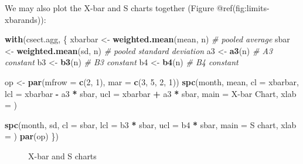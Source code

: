 \documentclass[
]{book}
\makeatletter
\newenvironment{Shaded}{\begin{snugshade}}{\end{snugshade}}
\newcommand{\AttributeTok}[1]{\textcolor[rgb]{0.13,0.29,0.53}{#1}}
\newcommand{\CommentTok}[1]{\textcolor[rgb]{0.56,0.35,0.01}{\textit{#1}}}
\newcommand{\DecValTok}[1]{\textcolor[rgb]{0.00,0.00,0.81}{#1}}
\newcommand{\FunctionTok}[1]{\textcolor[rgb]{0.13,0.29,0.53}{\textbf{#1}}}
\newcommand{\NormalTok}[1]{#1}
\newcommand{\OtherTok}[1]{\textcolor[rgb]{0.56,0.35,0.01}{#1}}
\newcommand{\SpecialCharTok}[1]{\textcolor[rgb]{0.81,0.36,0.00}{\textbf{#1}}}
\newcommand{\StringTok}[1]{\textcolor[rgb]{0.31,0.60,0.02}{#1}}
\newcommand*\pandocbounded[1]{%
  \sbox\pandoc@box{#1}%
  \Gscale@div\@tempa{\textheight}{\dimexpr\ht\pandoc@box+\dp\pandoc@box\relax}%
  \Gscale@div\@tempb{\linewidth}{\wd\pandoc@box}%
  \ifdim\@tempb\p@<\@tempa\p@\let\@tempa\@tempb\fi%
  \ifdim\@tempa\p@<\p@\scalebox{\@tempa}{\usebox\pandoc@box}%
  \else\usebox{\pandoc@box}%
  \fi%
}
\makeatother
\begin{document}
We may also plot the X-bar and S charts together (Figure
@ref(fig:limits-xbarands)):

\begin{Shaded}
\begin{Highlighting}[]
\FunctionTok{with}\NormalTok{(csect.agg, \{}
\NormalTok{  xbarbar }\OtherTok{\textless{}{-}} \FunctionTok{weighted.mean}\NormalTok{(mean, n)  }\CommentTok{\# pooled average}
\NormalTok{  sbar    }\OtherTok{\textless{}{-}} \FunctionTok{weighted.mean}\NormalTok{(sd, n)    }\CommentTok{\# pooled standard deviation}
\NormalTok{  a3      }\OtherTok{\textless{}{-}} \FunctionTok{a3}\NormalTok{(n)                   }\CommentTok{\# A3 constant}
\NormalTok{  b3      }\OtherTok{\textless{}{-}} \FunctionTok{b3}\NormalTok{(n)                   }\CommentTok{\# B3 constant}
\NormalTok{  b4      }\OtherTok{\textless{}{-}} \FunctionTok{b4}\NormalTok{(n)                   }\CommentTok{\# B4 constant}
  
\NormalTok{  op }\OtherTok{\textless{}{-}} \FunctionTok{par}\NormalTok{(}\AttributeTok{mfrow =} \FunctionTok{c}\NormalTok{(}\DecValTok{2}\NormalTok{, }\DecValTok{1}\NormalTok{),}
            \AttributeTok{mar   =} \FunctionTok{c}\NormalTok{(}\DecValTok{3}\NormalTok{, }\DecValTok{5}\NormalTok{, }\DecValTok{2}\NormalTok{, }\DecValTok{1}\NormalTok{))}
  \FunctionTok{spc}\NormalTok{(month, mean,}
      \AttributeTok{cl   =}\NormalTok{ xbarbar,}
      \AttributeTok{lcl  =}\NormalTok{ xbarbar }\SpecialCharTok{{-}}\NormalTok{ a3 }\SpecialCharTok{*}\NormalTok{ sbar,}
      \AttributeTok{ucl  =}\NormalTok{ xbarbar }\SpecialCharTok{+}\NormalTok{ a3 }\SpecialCharTok{*}\NormalTok{ sbar,}
      \AttributeTok{main =} \StringTok{\textquotesingle{}X{-}bar Chart\textquotesingle{}}\NormalTok{,}
      \AttributeTok{xlab =} \StringTok{\textquotesingle{}\textquotesingle{}}\NormalTok{)}
  
  \FunctionTok{spc}\NormalTok{(month, sd,}
      \AttributeTok{cl   =}\NormalTok{ sbar,}
      \AttributeTok{lcl  =}\NormalTok{ b3 }\SpecialCharTok{*}\NormalTok{ sbar,}
      \AttributeTok{ucl  =}\NormalTok{ b4 }\SpecialCharTok{*}\NormalTok{ sbar,}
      \AttributeTok{main =} \StringTok{\textquotesingle{}S chart\textquotesingle{}}\NormalTok{,}
      \AttributeTok{xlab =} \StringTok{\textquotesingle{}\textquotesingle{}}\NormalTok{)}
  \FunctionTok{par}\NormalTok{(op)}
\NormalTok{\})}
\end{Highlighting}
\end{Shaded}

\begin{figure}
\centering
\pandocbounded{}
\caption{X-bar and S charts}
\end{figure}
\end{document}
